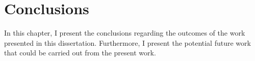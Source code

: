 
\chapter[Conclusions]{Conclusions}
\label{ch6}

In this chapter, I present the conclusions regarding the outcomes of the work presented in this dissertation. 
Furthermore, I present the potential future work that could be carried out from the present work.





